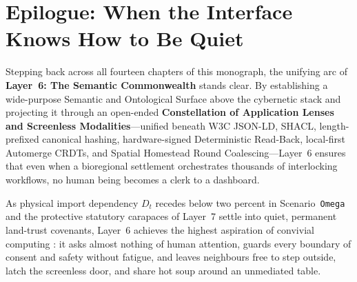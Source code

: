 \section*{Epilogue: When the Interface Knows How to Be Quiet}

Stepping back across all fourteen chapters of this monograph, the unifying arc of \textbf{Layer~6: The Semantic Commonwealth} stands clear. By establishing a wide-purpose Semantic and Ontological Surface above the cybernetic stack and projecting it through an open-ended \textbf{Constellation of Application Lenses and Screenless Modalities}---unified beneath W3C JSON-LD, SHACL, length-prefixed canonical hashing, hardware-signed Deterministic Read-Back, local-first Automerge CRDTs, and Spatial Homestead Round Coalescing---Layer~6 ensures that even when a bioregional settlement orchestrates thousands of interlocking workflows, no human being becomes a clerk to a dashboard.

As physical import dependency $D_t$ recedes below two percent in Scenario~\texttt{Omega} and the protective statutory carapaces of Layer~7 settle into quiet, permanent land-trust covenants, Layer~6 achieves the highest aspiration of convivial computing \parencite{illich1973,weiser1996calm}: it asks almost nothing of human attention, guards every boundary of consent and safety without fatigue, and leaves neighbours free to step outside, latch the screenless door, and share hot soup around an unmediated table.
